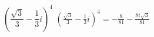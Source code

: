 { $\left(\dfrac{\sqrt{3}}{3} - \dfrac{1}{3} i\right)^4$}
{ $\left(\frac{\sqrt{3}}{3} - \frac{1}{3} i\right)^4 =-\frac{8}{81} - \frac{8i\sqrt{3}}{81}$}
